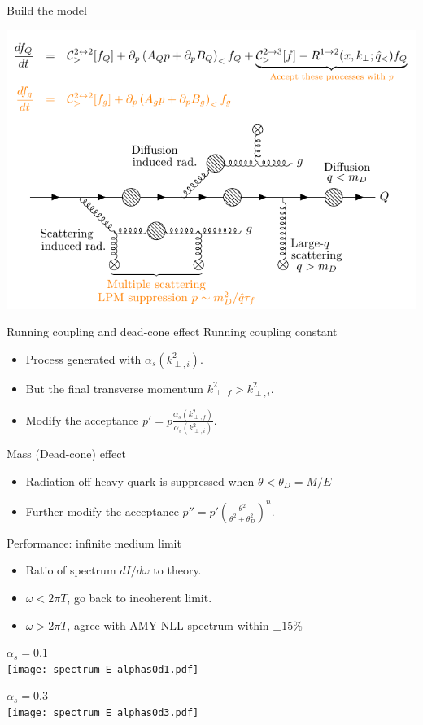 \documentclass[11pt]{beamer}
\begin{document}
\begin{frame}{Build the model}
\begin{overprint}
\includegraphics[width=.9\textwidth]{22-11-23-12-lpm.pdf}
\end{overprint}
\end{frame}

\begin{frame}{Running coupling and dead-cone effect}
Running coupling constant
\begin{itemize}
\item Process generated with $\alpha_s(k_{\perp,i}^2)$. 
\item But the final transverse momentum $k_{\perp,f}^2 > k_{\perp,i}^2$.
\item Modify the acceptance $p' = p\frac{\alpha_s(k_{\perp,f}^2)}{ \alpha_s(k_{\perp,i}^2)}$.
\end{itemize}
Mass (Dead-cone) effect
\begin{itemize}
\item Radiation off heavy quark is suppressed when $\theta < \theta_D = M/E$
\item Further modify the acceptance $p'' = p' \left(\frac{\theta^2}{\theta^2 + \theta_D^2} \right)^n$.
\end{itemize}
\end{frame} 


\begin{frame}{Performance: infinite medium limit}
\begin{itemize}
\item Ratio of spectrum $dI/d\omega$ to theory.
\item $\omega < 2\pi T$, go back to incoherent limit.
\item $\omega > 2\pi T$, agree with AMY-NLL spectrum within $\pm 15\%$
\end{itemize}
\begin{overprint}
\begin{center}
$\alpha_s = 0.1$\\
\texttt{[image: spectrum\_E\_alphas0d1.pdf]}
\end{center}
\begin{center}
$\alpha_s = 0.3$\\
\texttt{[image: spectrum\_E\_alphas0d3.pdf]}
\end{center}
\end{overprint}
\end{frame}
\end{document}
